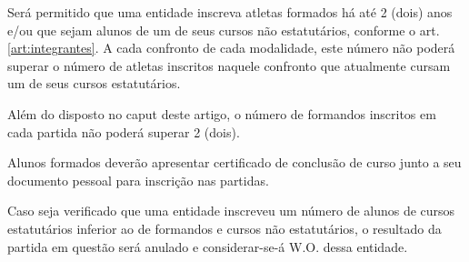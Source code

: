 \begin{article}
	Será permitido que uma entidade inscreva atletas formados há até 2 (dois) anos e/ou que sejam alunos de um de seus cursos não estatutários, conforme o art. \ref{art:integrantes}\ulo. A cada confronto de cada modalidade, este número não poderá superar o número de atletas inscritos naquele confronto que atualmente cursam um de seus cursos estatutários.

	\begin{xparagraph}
		Além do disposto no caput deste artigo, o número de formandos inscritos em cada partida não poderá superar 2 (dois).
	\end{xparagraph}

	\begin{xparagraph}
		Alunos formados deverão apresentar certificado de conclusão de curso junto a seu documento pessoal para inscrição nas partidas.
	\end{xparagraph}

	\begin{xparagraph}
		Caso seja verificado que uma entidade inscreveu um número de alunos de cursos estatutários inferior ao de formandos e cursos não estatutários, o resultado da partida em questão será anulado e considerar-se-á W.O. dessa entidade.
	\end{xparagraph}
\end{article}

